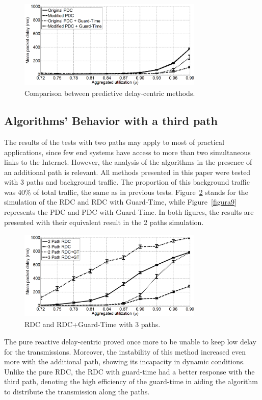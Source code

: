 \documentclass[letterpaper,10pt,oneside,conference,final]{sbrt2015}
\begin{document}
\begin{figure}[h!]
	\centering
	\includegraphics[width=8.8cm,height=4.3cm]{figura7}
	\caption{Comparison between predictive delay-centric methods.}
	\label{figura7}
\end{figure}

\subsection{Algorithms' Behavior with a third path}
The results of the tests with two paths may apply to most of practical applications, since few end systems have access to more than two simultaneous links to the Internet. However, the analysis of the algorithms in the presence of an additional path is relevant. All methods presented in this paper were tested with 3 paths and background traffic. The proportion of this background traffic was 40\% of total traffic, the same as in previous tests. Figure~\ref{figura8} stands for the simulation of the RDC and RDC with Guard-Time, while Figure~\ref{figura9} represents the PDC and PDC with Guard-Time. In both figures, the results are presented with their equivalent result in the 2 paths simulation.

\begin{figure}[h!]
	\centering
	\includegraphics[width=8.8cm,height=4.3cm]{figura8}
	\caption{RDC and RDC+Guard-Time with 3 paths.}
	\label{figura8}
\end{figure}

The pure reactive delay-centric proved once more to be unable to keep low delay for the transmissions. Moreover, the instability of this method increased even more with the additional path, showing its incapacity in dynamic conditions. Unlike the pure RDC, the RDC with guard-time had a better response with the third path, denoting the high efficiency of the guard-time in aiding the algorithm to distribute the transmission along the paths.
\end{document}
